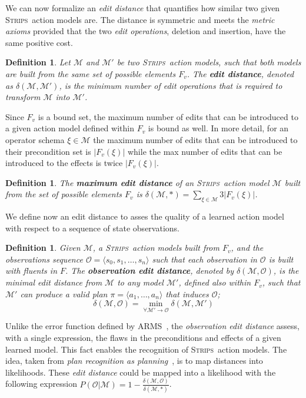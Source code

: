 \documentclass[3p,times]{elsarticle}
\newtheorem{mydefinition}[mytheorem]{Definition}
\newcommand{\strips}{\textsc{Strips}}     %
\newcommand{\tup}[1]{{\langle #1 \rangle}}
\begin{document}
We can now formalize an {\em edit distance} that quantifies how similar two given \strips\ action models are. The distance is symmetric and meets the {\em metric axioms} provided that the two {\em edit operations}, deletion and insertion, have the same positive cost.

\begin{mydefinition}
Let $\mathcal{M}$ and $\mathcal{M}'$ be two \strips\ action models, such that both models are built from the same set of possible elements $F_v$. The {\bf edit distance}, denoted as $\delta(\mathcal{M},\mathcal{M}')$, is the minimum number of {\em edit operations} that is required to transform $\mathcal{M}$ into $\mathcal{M}'$.
\end{mydefinition}

Since $F_v$ is a bound set, the maximum number of edits that can be introduced to a given action model defined within $F_v$ is bound as well. In more detail, for an operator schema $\xi\in\mathcal{M}$ the maximum number of edits that can be introduced to their precondition set is $|F_v(\xi)|$ while the max number of edits that can be introduced to the effects is twice $|F_v(\xi)|$.

\begin{mydefinition}
The \textbf{maximum edit distance} of an \strips\ action model $\mathcal{M}$ built from the set of possible elements $F_v$ is $\delta(\mathcal{M},*)=\sum_{\xi\in\mathcal{M}} 3|F_v(\xi)|$.
\end{mydefinition}

We define now an edit distance to asses the quality of a learned action model with respect to a sequence of state observations.

\begin{mydefinition}
  Given $\mathcal{M}$, a \strips\ action models built from $F_v$, and the observations sequence $\mathcal{O}=\tup{s_0, s_1, \ldots, s_n}$ such that each observation in $\mathcal{O}$ is built with fluents in $F$. The {\bf observation edit distance}, denoted by  $\delta(\mathcal{M},\mathcal{O})$, is the minimal edit distance from $\mathcal{M}$ to any model $\mathcal{M}'$, defined also within $F_v$, such that $\mathcal{M}'$ can produce a valid plan $\pi=\tup{a_1, \ldots, a_n}$ that induces $\mathcal{O}$; \[\delta(\mathcal{M},\mathcal{O})=\min_{\forall \mathcal{M}' \rightarrow \mathcal{O}} \delta(\mathcal{M},\mathcal{M}')\]
\end{mydefinition}

Unlike the error function defined by {\sc ARMS}~\cite{yang2007learning}, the {\em observation edit distance} assess, with a single expression, the flaws in the preconditions and effects of a given learned model. This fact enables the recognition of \strips\ action models. The idea, taken from {\em plan recognition as planning}~\cite{ramirez2009plan}, is to map distances into likelihoods. These {\em edit distance} could be mapped into a likelihood with the following expression $P(\mathcal{O}|\mathcal{M})=1-\frac{\delta(\mathcal{M},\mathcal{O})}{\delta(\mathcal{M},*)}$.
\end{document}
